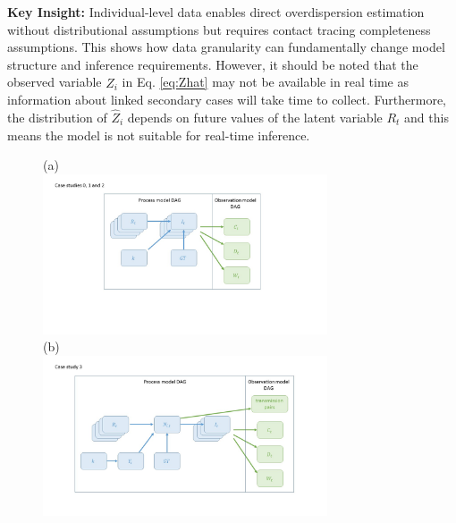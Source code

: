 \documentclass{article}
\begin{document}
\textbf{Key Insight:} Individual-level data enables direct overdispersion estimation without distributional assumptions but requires contact tracing completeness assumptions. This shows how data granularity can fundamentally change model structure and inference requirements. However, it should be noted that the observed variable $\hat{Z}_i$ in Eq. \eqref{eq:Zhat} may not be available in real time as information about linked secondary cases will take time to collect. Furthermore, the distribution of  $\hat{Z}_i$ depends on future values of the latent variable $R_t$ and this means the model is not suitable for real-time inference. 

\begin{figure}
\centering
(a) \\
\includegraphics[width=0.75\textwidth]{figures/case_study_0_1_2.jpg}\\
(b)\\
\includegraphics[width=0.75\textwidth]{figures/case_study_3.jpg}
\label{fig:CS3_DAG}

\end{figure}
\end{document}
